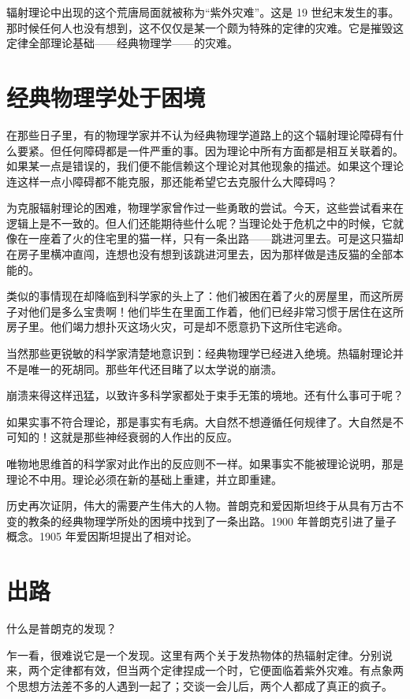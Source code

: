 辐射理论中出现的这个荒唐局面就被称为“紫外灾难”。这是 19 世纪末发生的事。那时候任何人也没有想到，这不仅仅是某一个颇为特殊的定律的灾难。它是摧毁这定律全部理论基础——经典物理学——的灾难。

\section{经典物理学处于困境}

在那些日子里，有的物理学家并不认为经典物理学道路上的这个辐射理论障碍有什么要紧。但任何障碍都是一件严重的事。因为理论中所有方面都是相互关联着的。如果某一点是错误的，我们便不能信赖这个理论对其他现象的描述。如果这个理论连这样一点小障碍都不能克服，那还能希望它去克服什么大障碍吗？

为克服辐射理论的困难，物理学家曾作过一些勇敢的尝试。今天，这些尝试看来在逻辑上是不一致的。但人们还能期待些什么呢？当理论处于危机之中的时候，它就像在一座着了火的住宅里的猫一样，只有一条出路——跳进河里去。可是这只猫却在房子里横冲直闯，连想也没有想到该跳进河里去，因为那样做是违反猫的全部本能的。

类似的事情现在却降临到科学家的头上了：他们被困在着了火的房屋里，而这所房子对他们是多么宝贵啊！他们毕生在里面工作着，他们已经非常习惯于居住在这所房子里。他们竭力想扑灭这场火灾，可是却不愿意扔下这所住宅逃命。

当然那些更锐敏的科学家清楚地意识到：经典物理学已经进入绝境。热辐射理论并不是唯一的死胡同。那些年代还目睹了以太学说的崩溃。

崩溃来得这样迅猛，以致许多科学家都处于束手无策的境地。还有什么事可于呢？

如果实事不符合理论，那是事实有毛病。大自然不想遵循任何规律了。大自然是不可知的！这就是那些神经衰弱的人作出的反应。

唯物地思维首的科学家对此作出的反应则不一样。如果事实不能被理论说明，那是理论不中用。理论必须在新的基础上重建，并立即重建。

历史再次证阴，伟大的需要产生伟大的人物。普朗克和爱因斯坦终于从具有万古不变的教条的经典物理学所处的困境中找到了一条出路。1900 年普朗克引进了量子概念。1905 年爱因斯坦提出了相对论。

\section{出路}

什么是普朗克的发现？

乍一看，很难说它是一个发现。这里有两个关于发热物体的热辐射定律。分别说来，两个定律都有效，但当两个定律捏成一个时，它便面临着紫外灾难。有点象两个思想方法差不多的人遇到一起了；交谈一会儿后，两个人都成了真正的疯子。

